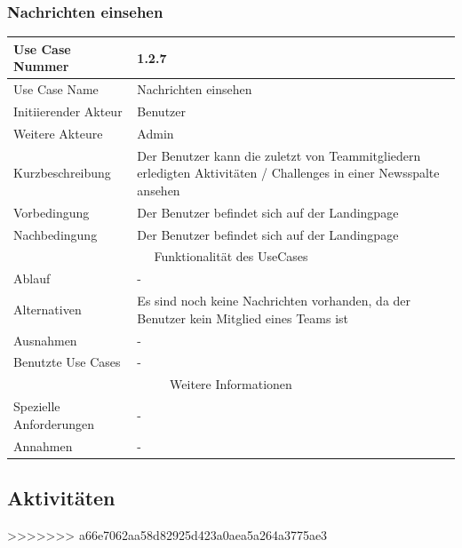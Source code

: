 \documentclass[10pt,a4paper]{article}
\begin{document}
		\subsubsection{Nachrichten einsehen}
		\begin{tabular}{|l|p{.5\linewidth}|}
			\hline Use Case Nummer & 1.2.7 \\ 
			\hline Use Case Name & Nachrichten einsehen \\ 
			\hline Initiierender Akteur & Benutzer \\
			\hline Weitere Akteure & Admin \\
			\hline Kurzbeschreibung & Der Benutzer kann die zuletzt von Teammitgliedern erledigten Aktivitäten / Challenges in einer Newsspalte ansehen \\
			\hline Vorbedingung & Der Benutzer befindet sich auf der Landingpage \\
			\hline Nachbedingung & Der Benutzer befindet sich auf der Landingpage \\ %
			\hline \multicolumn{2}{|c|}{Funktionalität des UseCases}\\
			\hline Ablauf & - \\
			\hline Alternativen & Es sind noch keine Nachrichten vorhanden, da der Benutzer kein Mitglied eines Teams ist \\
			\hline Ausnahmen & - \\
			\hline Benutzte Use Cases & - \\
			\hline \multicolumn{2}{|c|}{Weitere Informationen} \\
			\hline Spezielle Anforderungen & - \\
			\hline Annahmen & - \\
			\hline
		\end{tabular}
\subsection{Aktivit\"aten}
>>>>>>> a66e7062aa58d82925d423a0aea5a264a3775ae3
\end{document}
